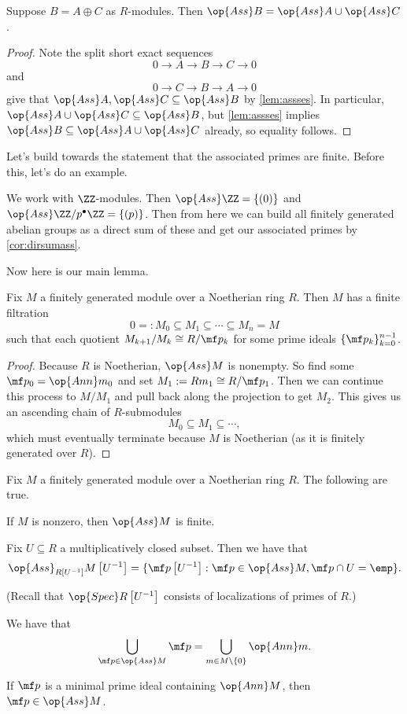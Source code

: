 \begin{corollary} \label{cor:dirsumass}
	Suppose $B=A\oplus C$ as $R$-modules. Then $\op{Ass}B=\op{Ass}A\cup\op{Ass}C$.
\end{corollary}
\begin{proof}
	Note the split short exact sequences
	\[0\to A\to B\to C\to 0\]
	and
	\[0\to C\to B\to A\to 0\]
	give that $\op{Ass}A,\op{Ass}C\subseteq\op{Ass}B$ by \autoref{lem:assses}. In particular, $\op{Ass}A\cup\op{Ass}C\subseteq\op{Ass}B$, but \autoref{lem:assses} implies $\op{Ass}B\subseteq\op{Ass}A\cup\op{Ass}C$ already, so equality follows.
\end{proof}

Let's build towards the statement that the associated primes are finite. Before this, let's do an example.
\begin{ex}
	We work with $\ZZ$-modules. Then $\op{Ass}\ZZ=\{(0)\}$ and $\op{Ass}\ZZ/p^\bullet\ZZ=\{(p)\}$. Then from here we can build all finitely generated abelian groups as a direct sum of these and get our associated primes by \autoref{cor:dirsumass}.
\end{ex}
Now here is our main lemma.
\begin{lemma} \label{lem:fingenfiltration}
	Fix $M$ a finitely generated module over a Noetherian ring $R$. Then $M$ has a finite filtration
	\[0=:M_0\subseteq M_1\subseteq\cdots\subseteq M_n=M\]
	such that each quotient $M_{k+1}/M_k\cong R/\mf p_k$ for some prime ideals $\{\mf p_k\}_{k=0}^{n-1}$.
\end{lemma}
\begin{proof}
	Because $R$ is Noetherian, $\op{Ass}M$ is nonempty. So find some $\mf p_0=\op{Ann}m_0$ and set $M_1:=Rm_1\cong R/\mf p_1$. Then we can continue this process to $M/M_1$ and pull back along the projection to get $M_2$. This gives us an ascending chain of $R$-submodules
	\[M_0\subseteq M_1\subseteq\cdots,\]
	which must eventually terminate because $M$ is Noetherian (as it is finitely generated over $R$).
\end{proof}
\begin{theorem}
	Fix $M$ a finitely generated module over a Noetherian ring $R$. The following are true.
	\begin{listalph}
		\item If $M$ is nonzero, then $\op{Ass}M$ is finite.
		\item Fix $U\subseteq R$ a multiplicatively closed subset. Then we have that
		\[\op{Ass}_{R\left[U^{-1}\right]}M\left[U^{-1}\right]=\{\mf p\left[U^{-1}\right]:\mf p\in\op{Ass}M,\mf p\cap U=\emp\}.\]

		(Recall that $\op{Spec}R\left[U^{-1}\right]$ consists of localizations of primes of $R$.)
		\item We have that
		\[\bigcup_{\mf p\in\op{Ass}M}\mf p=\bigcup_{m\in M\setminus\{0\}}\op{Ann}m.\]
		\item If $\mf p$ is a minimal prime ideal containing $\op{Ann}M$, then $\mf p\in\op{Ass}M$.
	\end{listalph}
\end{theorem}
